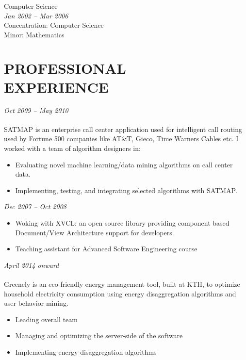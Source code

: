 \documentclass[margin, 10pt]{res} %
\begin{document}
\begin{resume}
{\bf \color{Black}{Bachelor of Science,}} Computer Science \\
{\color{RubineRed}{University of Peshawar, Pakistan}} \hfill \textit{Jan 2002 -- Mar 2006} \\
Concentration: Computer Science \\
Minor: Mathematics

 
\section{PROFESSIONAL \\ EXPERIENCE}

{\sl {}} \hfill \textit{Oct 2009 -- May 2010} \\
{\color{RubineRed}{SATMAP Inc, Machine Learning Team, Pakistan}}  \\
SATMAP is an enterprise call center application used for intelligent call routing used by Fortune 500 companies like AT\&T, Gieco, Time Warners Cables etc. I worked with a team of algorithm designers in:

\begin{itemize} \itemsep -2pt %
\item Evaluating novel machine learning/data mining algorithms on call center data. 
\item Implementing, testing, and integrating selected algorithms with SATMAP. 
\end{itemize}
 
{\sl \textbf{}} \hfill \textit{Dec 2007 -- Oct 2008} \\
{\color{RubineRed}{Computer Science Department, LUMS, Pakistan}} 
\begin{itemize} 
\item Woking with XVCL: an open source library providing component based Document/View Architecture support for developers.
\item Teaching assistant for Advanced Software Engineering course
\end{itemize} 

{\sl \textbf{}} \hfill \textit{April 2014 onward} \\
{\color{RubineRed}{Greenely, Sweden}} \\
Greenely is an eco-friendly energy management tool, built at KTH, to optimize household electricity consumption using energy disaggregation algorithms and user behavior mining.
\begin{itemize} 
\item Leading overall team
\item Managing and optimizing the server-side of the software
\item Implementing energy disaggregation algorithms
\end{itemize} 


\end{resume}
\end{document}
